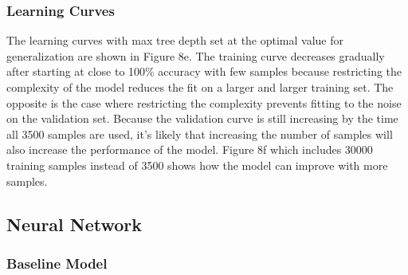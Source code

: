 \documentclass{article}
\begin{document}
\subsubsection*{Learning Curves}
The learning curves with max tree depth set at the optimal value for generalization are shown in Figure 8e. The training curve decreases gradually after starting at close to 100\% accuracy with few samples because restricting the complexity of the model reduces the fit on a larger and larger training set. The opposite is the case where restricting the complexity prevents fitting to the noise on the validation set. Because the validation curve is still increasing by the time all 3500 samples are used, it's likely that increasing the number of samples will also increase the performance of the model. Figure 8f which includes 30000 training samples instead of 3500 shows how the model can improve with more samples.

\subsection{Neural Network}
\subsubsection*{Baseline Model}
\end{document}
